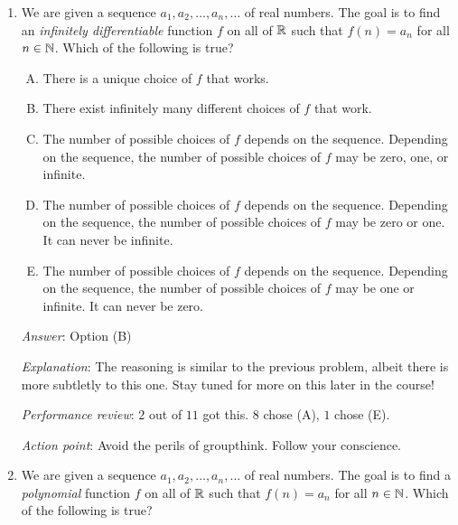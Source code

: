 \documentclass[10pt]{amsart}
\begin{document}
\begin{enumerate}
  {\em Answer}: Option (B)

  {\em Explanation}: Imagine the graph of the sequence, i.e., we plot
  the points $(n,a_n)$ in the coordinate plane for all $n \in \N$. The
  goal is to find a continuous function whose graph passes through all
  these points. We could do this in many ways. For instance, for each
  pair of adjacent points, we could join them up by a line segment or
  some other continuous curve. And to the left of $1$ we could do any
  of a number of things.

  {\em Performance review}: $9$ out of $11$ got this. $1$ chose (C),
  $1$ chose (E).
\item We are given a sequence $a_1, a_2, \dots, a_n, \dots$ of real
  numbers. The goal is to find an {\em infinitely differentiable}
  function $f$ on all of $\mathbb{R}$ such that $f(n) = a_n$ for all $n \in
  \N$. Which of the following is true?

  \begin{enumerate}[(A)]
  \item There is a unique choice of $f$ that works.
  \item There exist infinitely many different choices of $f$ that work.
  \item The number of possible choices of $f$ depends on the
    sequence. Depending on the sequence, the number of possible
    choices of $f$ may be zero, one, or infinite.
  \item The number of possible choices of $f$ depends on the
    sequence. Depending on the sequence, the number of possible
    choices of $f$ may be zero or one. It can never be infinite.
  \item The number of possible choices of $f$ depends on the
    sequence. Depending on the sequence, the number of possible
    choices of $f$ may be one or infinite. It can never be zero.
  \end{enumerate}

  {\em Answer}: Option (B)

  {\em Explanation}: The reasoning is similar to the previous problem,
  albeit there is more subtletly to this one. Stay tuned for more on
  this later in the course!

  {\em Performance review}: $2$ out of $11$ got this. $8$ chose (A),
  $1$ chose (E).

  {\em Action point}: Avoid the perils of groupthink. Follow your
  conscience.
\item We are given a sequence $a_1, a_2, \dots, a_n, \dots$ of real
  numbers. The goal is to find a {\em polynomial}
  function $f$ on all of $\mathbb{R}$ such that $f(n) = a_n$ for all $n \in
  \N$. Which of the following is true?


\end{enumerate}
\end{document}
